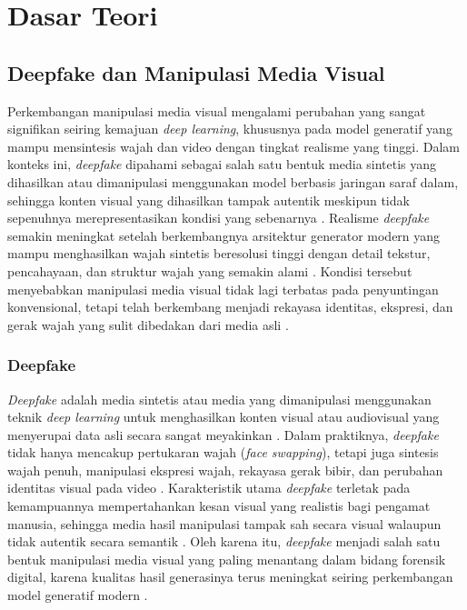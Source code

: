 \section{Dasar Teori} \label{II.Teori}
\subsection{Deepfake dan Manipulasi Media Visual} \label{II.Teori1}
Perkembangan manipulasi media visual mengalami perubahan yang sangat signifikan seiring kemajuan \textit{deep learning}, khususnya pada model generatif yang mampu mensintesis wajah dan video dengan tingkat realisme yang tinggi. Dalam konteks ini, \textit{deepfake} dipahami sebagai salah satu bentuk media sintetis yang dihasilkan atau dimanipulasi menggunakan model berbasis jaringan saraf dalam, sehingga konten visual yang dihasilkan tampak autentik meskipun tidak sepenuhnya merepresentasikan kondisi yang sebenarnya \cite{Mirsky_2021}. Realisme \textit{deepfake} semakin meningkat setelah berkembangnya arsitektur generator modern yang mampu menghasilkan wajah sintetis beresolusi tinggi dengan detail tekstur, pencahayaan, dan struktur wajah yang semakin alami \cite{karras2019stylebasedgeneratorarchitecturegenerative}. Kondisi tersebut menyebabkan manipulasi media visual tidak lagi terbatas pada penyuntingan konvensional, tetapi telah berkembang menjadi rekayasa identitas, ekspresi, dan gerak wajah yang sulit dibedakan dari media asli \cite{Mirsky_2021}\cite{karras2019stylebasedgeneratorarchitecturegenerative}. \par

\subsubsection{Deepfake} \label{II.Teori1.1}
\textit{Deepfake} adalah media sintetis atau media yang dimanipulasi menggunakan teknik \textit{deep learning} untuk menghasilkan konten visual atau audiovisual yang menyerupai data asli secara sangat meyakinkan \cite{Mirsky_2021}. Dalam praktiknya, \textit{deepfake} tidak hanya mencakup pertukaran wajah (\textit{face swapping}), tetapi juga sintesis wajah penuh, manipulasi ekspresi wajah, rekayasa gerak bibir, dan perubahan identitas visual pada video \cite{Mirsky_2021}. Karakteristik utama \textit{deepfake} terletak pada kemampuannya mempertahankan kesan visual yang realistis bagi pengamat manusia, sehingga media hasil manipulasi tampak sah secara visual walaupun tidak autentik secara semantik \cite{Mirsky_2021}. Oleh karena itu, \textit{deepfake} menjadi salah satu bentuk manipulasi media visual yang paling menantang dalam bidang forensik digital, karena kualitas hasil generasinya terus meningkat seiring perkembangan model generatif modern \cite{Mirsky_2021}\cite{karras2019stylebasedgeneratorarchitecturegenerative}. \par

